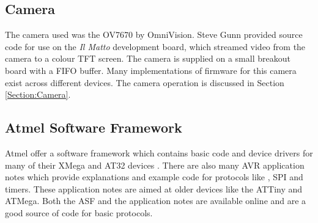 \subsection{Camera}

The camera used was the OV7670 by OmniVision. Steve Gunn provided source code for use on the \textit{Il Matto} development board, which streamed video from the camera to a colour TFT screen. The camera is supplied on a small breakout board with a FIFO buffer. Many implementations of firmware for this camera exist across different devices. The camera operation is discussed in Section \ref{Section:Camera}. 
\subsection{Atmel Software Framework}

Atmel offer a software framework which contains basic code and device drivers for many of their XMega and AT32 devices \citep{Atmel:ASF}. There are also many AVR application notes which provide explanations and example code for protocols like \itc , SPI and timers. These application notes are aimed at older devices like the ATTiny and ATMega. Both the ASF and the application notes are available online and are a good source of code for basic protocols.

%
%
%
%
%


